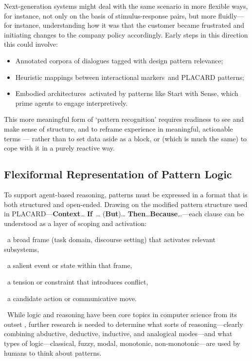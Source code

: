 \documentclass[acmlarge,timestamp]{acmart}
\providecommand{\tightlist}{%
  \setlength{\itemsep}{0pt}\setlength{\parskip}{0pt}}
\begin{document}
{Next-generation systems might deal with the same scenario in more
flexible ways, for instance, not only on the basis of stimulus-response
pairs, but more fluidly---for instance, understanding how it was that
the customer became frustrated and initiating changes to the company
policy accordingly. Early steps in this direction this could involve:}

\begin{itemize}
\tightlist
\item
  {Annotated corpora of dialogues tagged with }{design pattern
  relevance}{;}
\item
  {Heuristic mappings between }{interactional markers}{~and PLACARD
  patterns;}
\item
  {Embodied architectures}{~activated by patterns like }{Start with
  Sense}{, which prime agents to engage interpretively.}
\end{itemize}

{This more meaningful form of `pattern recognition' requires readiness
to see and make sense of structure, and to reframe experience in
meaningful, actionable terms --- rather than to set data aside as a
block, or (which is much the same) to cope with it in a purely reactive
way.}

\subsection{Flexiformal Representation of Pattern Logic}

{To support agent-based reasoning, patterns must be expressed in a
format that is both structured and open-ended. Drawing on the modified
pattern structure used in PLACARD---\textbf{Context}{\ldots{} }\textbf{If}{~\ldots{} }{(\textbf{But})}{\ldots{}
}\textbf{Then}{\ldots{}}\textbf{Because}{\ldots{}}---each clause can be understood as a layer of scoping and activation:}

\smallskip
\begin{description}
\tightlist
\item[Context:]{~a broad frame (task domain, discourse setting) that
  activates relevant subsystems,}
\item[If condition:]{~a salient event or state within that frame,}
\item[But:]{~a tension or constraint that introduces conflict,}
\item[Then:]{~a candidate action or communicative move.}
\item[Because:]{~}While logic and reasoning have been core topics in
  computer science from its outset \cite{sowa-logic}, further research
  is needed to determine what sorts of reasoning---clearly combining
  abductive, deductive, inductive, and analogical modes---and what
  types of logic---classical, fuzzy, modal, monotonic,
  non-monotonic---are used by humans to think about patterns.
\end{description}
\end{document}
